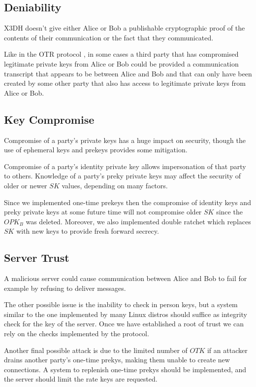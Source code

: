 \subsection{Deniability}
\label{subsec:Deniability}

X3DH doesn’t give either Alice or Bob a publishable cryptographic proof of the contents of their communication or the fact that they communicated.

Like in the OTR protocol \cite{OTR}, in some cases a third party that has compromised legitimate private keys from Alice or Bob could be provided a communication transcript that appears to be between Alice and Bob and that can only have been created by some other party that also has access to legitimate private keys from Alice or Bob.

\subsection{Key Compromise}
\label{subsec:KeyCompromise}

Compromise of a party's private keys has a huge impact on security, though the use of ephemeral keys and prekeys provides some mitigation.

Compromise of a party's identity private key allows impersonation of that party to others. Knowledge of a party's preky private keys may affect the security of older or newer $SK$ values, depending on many factors.

Since we implemented one-time prekeys then the compromise of identity keys and preky private keys at some future time will not compromise older $SK$ since the $OPK_B$ was deleted. Moreover, we also implemented double ratchet which replaces $SK$ with new keys to provide fresh forward secrecy.

\subsection{Server Trust}
\label{subsec:ServerTrust}

A malicious server could cause communication between Alice and Bob to fail for example by refusing to deliver messages.

The other possible issue is the inability to check in person keys, but a system similar to the one implemented by many Linux distros should suffice as integrity check for the key of the server. Once we have established a root of trust we can rely on the checks implemented by the protocol.

Another final possible attack is due to the limited number of $OTK$ if an attacker drains another party's one-time prekys, making them unable to create new connections. A system to replenish one-time prekys should be implemented, and the server should limit the rate keys are requested.
